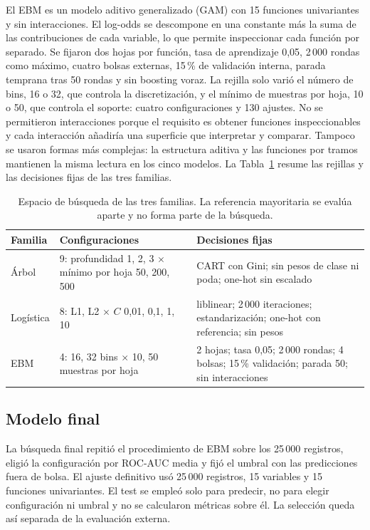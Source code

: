 El EBM es un modelo aditivo generalizado (GAM) con 15 funciones univariantes y sin interacciones. El log-odds se descompone en una constante más la suma de las contribuciones de cada variable, lo que permite inspeccionar cada función por separado. Se fijaron dos hojas por función, tasa de aprendizaje 0,05, 2\,000 rondas como máximo, cuatro bolsas externas, 15\,\% de validación interna, parada temprana tras 50 rondas y sin boosting voraz. La rejilla solo varió el número de bins, 16 o 32, que controla la discretización, y el mínimo de muestras por hoja, 10 o 50, que controla el soporte: cuatro configuraciones y 130 ajustes. No se permitieron interacciones porque el requisito es obtener funciones inspeccionables y cada interacción añadiría una superficie que interpretar y comparar. Tampoco se usaron formas más complejas: la estructura aditiva y las funciones por tramos mantienen la misma lectura en los cinco modelos. La Tabla~\ref{tab:search} resume las rejillas y las decisiones fijas de las tres familias.

\begin{table}[H]
\centering
\small
\caption{Espacio de búsqueda de las tres familias. La referencia mayoritaria se evalúa aparte y no forma parte de la búsqueda.}
\label{tab:search}
\begin{tabularx}{\textwidth}{@{}p{1.8cm} p{5.6cm} X@{}}
\toprule
Familia & Configuraciones & Decisiones fijas \\
\midrule
Árbol & 9: profundidad 1, 2, 3 $\times$ mínimo por hoja 50, 200, 500 & CART con Gini; sin pesos de clase ni poda; one-hot sin escalado \\
Logística & 8: L1, L2 $\times$ $C$ 0,01, 0,1, 1, 10 & liblinear; 2\,000 iteraciones; estandarización; one-hot con referencia; sin pesos \\
EBM & 4: 16, 32 bins $\times$ 10, 50 muestras por hoja & 2 hojas; tasa 0,05; 2\,000 rondas; 4 bolsas; 15\,\% validación; parada 50; sin interacciones \\
\bottomrule
\end{tabularx}
\end{table}

\subsection{Modelo final}
La búsqueda final repitió el procedimiento de EBM sobre los 25\,000 registros, eligió la configuración por ROC-AUC media y fijó el umbral con las predicciones fuera de bolsa. El ajuste definitivo usó 25\,000 registros, 15 variables y 15 funciones univariantes. El test se empleó solo para predecir, no para elegir configuración ni umbral y no se calcularon métricas sobre él. La selección queda así separada de la evaluación externa.
